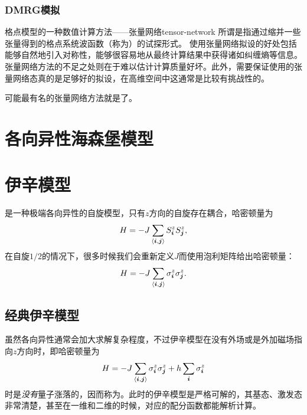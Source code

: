 \subsubsection{DMRG模拟}

\begin{back}{格点模型的一种数值计算方法——张量网络}{tensor-network}
    所谓是指通过缩并一些张量得到的格点系统波函数（称为）的试探形式。
    使用张量网络拟设的好处包括能够自然地引入对称性，能够很容易地从最终计算结果中获得诸如纠缠熵等信息。
    张量网络方法的不足之处则在于难以估计计算质量好坏。此外，需要保证使用的张量网络态真的是足够好的拟设，在高维空间中这通常是比较有挑战性的。

    可能最有名的张量网络方法就是了。
\end{back}

\section{各向异性海森堡模型}


\section{伊辛模型}

是一种极端各向异性的自旋模型，只有$z$方向的自旋存在耦合，哈密顿量为
\begin{equation}
    H = - J \sum_{\langle \vb*{i}, \vb*{j} \rangle} S_{\vb*{i}}^z S_{\vb*{j}}^z ,
\end{equation}
在自旋$1/2$的情况下，很多时候我们会重新定义$J$而使用泡利矩阵给出哈密顿量：
\begin{equation}
    H = - J \sum_{\langle \vb*{i}, \vb*{j} \rangle} \sigma^z_{\vb*{i}} \sigma^z_{\vb*{j}}.
\end{equation}

\subsection{经典伊辛模型}

虽然各向异性通常会加大求解复杂程度，不过伊辛模型在没有外场或是外加磁场指向$z$方向时，即哈密顿量为
\begin{equation}
    H = - J \sum_{\langle \vb*{i}, \vb*{j} \rangle} \sigma^z_{\vb*{i}} \sigma^z_{\vb*{j}} + h \sum_{\vb*{i}} \sigma^z_{\vb*{i}}
\end{equation}
时是\emph{没有}量子涨落的，因而称为。此时的伊辛模型是严格可解的，其基态、激发态非常清楚，甚至在一维和二维的时候，对应的配分函数都能解析计算。


